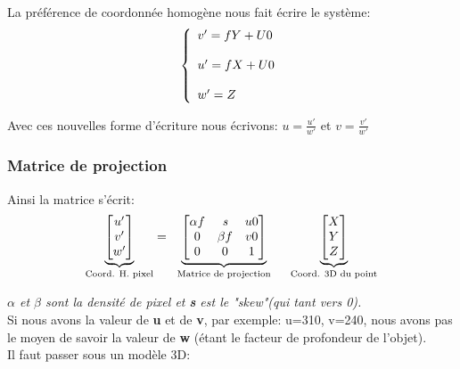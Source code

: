 \documentclass[12pt, french]{report}
\begin{document}
La préférence de coordonnée homogène nous fait écrire le système:
$$\left\{ 
    \begin{array}{ll}
        v'=fY+U0\\ \\
        u'=fX+U0 \\ \\
        w'=Z
    \end{array} \\
\right. $$

Avec ces nouvelles forme d'écriture nous écrivons: $u=\frac{u'}{w'}$ et $v=\frac{v'}{w'}$

\subsubsection{Matrice de projection}
Ainsi la matrice s'écrit:
$$\begin{matrix}
    
    \underbrace{\begin{bmatrix}
        u'\\v'\\w'\\
    \end{bmatrix}}_{\text{Coord. H. pixel}}
    
    =\hspace{0.2cm}
    
    \underbrace{\begin{bmatrix}
        \alpha f & \textit{s} & u0\\
        0 & \beta f & v0\\
        0 & 0 & 1\\
    \end{bmatrix}}_{\text{Matrice de projection}}
    
    \hspace{0.5cm}
    
    \underbrace{\begin{bmatrix}
        X\\Y\\Z\\
    \end{bmatrix}}_{\text{Coord. 3D du point}}
\end{matrix}$$

\textit{ \textbf{$\alpha$} et \textbf{$\beta$} sont la densité de pixel et \textbf{s} est le "skew"(qui tant vers 0).}\\

Si nous avons la valeur de \textbf{u} et de \textbf{v}, par exemple: u=310, v=240, nous avons pas le moyen de savoir la valeur de \textbf{w} (étant le facteur de profondeur de l'objet).\\
Il faut passer sous un modèle 3D:
\end{document}
